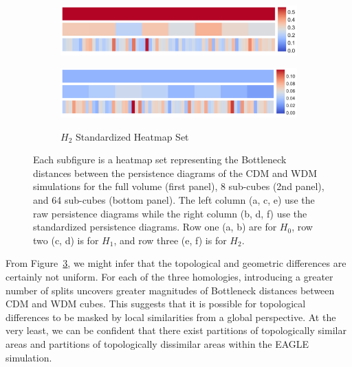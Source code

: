 \documentclass[12pt]{article}
\newcommand{\figref}[1]{Figure~\ref{#1}}
\begin{document}
\begin{figure}[htp!]
\begin{subfigure}{.45\textwidth}
    \includegraphics[width=\linewidth]{fig_12_hmap_dim2_nonorm.pdf}
    \label{fig:cubeHeatmap2}
  \end{subfigure}
  \begin{subfigure}{.45\textwidth}
    \centering
    \caption{$H_2$ Standardized Heatmap Set}
    \includegraphics[width=\linewidth]{fig_12_hmap_dim2_yesnorm.pdf}
    \label{fig:cubeHeatmapStand2}
  \end{subfigure}
  \caption{Each subfigure is a heatmap set representing the Bottleneck distances between the persistence diagrams of the CDM and WDM simulations for the full volume (first panel), 8 sub-cubes (2nd panel), and 64 sub-cubes (bottom panel).  The left column (a, c, e) use the raw persistence diagrams while the right column (b, d, f) use the standardized persistence diagrams.  Row one (a, b) are for $H_0$, row two (c, d) is for $H_1$, and row three (e, f) is for $H_2$.
}
  \label{fig:cubeHeatmap}
\end{figure}

From \figref{fig:cubeHeatmap}, we might infer that the topological and geometric differences are certainly not uniform. For each of the three homologies, introducing a greater number of splits uncovers greater magnitudes of Bottleneck distances between CDM and WDM cubes. This suggests that it is possible for topological differences to be masked by local similarities from a global perspective. At the very least, we can be confident that there exist partitions of topologically similar areas and partitions of topologically dissimilar areas within the EAGLE simulation.
\end{document}
